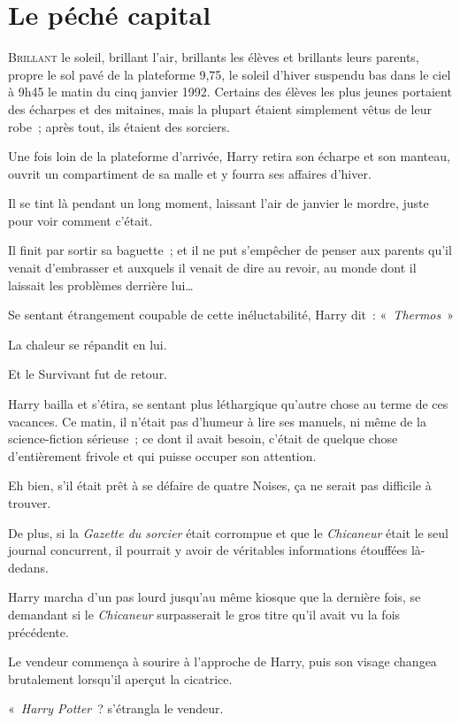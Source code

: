 \chapter{Le péché capital}

\lettrine{B}{rillant} le soleil, brillant l'air, brillants les élèves et brillants leurs parents, propre le sol pavé de la plateforme 9,75, le soleil d'hiver suspendu bas dans le ciel à 9h45 le matin du cinq janvier 1992.
Certains des élèves les plus jeunes portaient des écharpes et des mitaines, mais la plupart étaient simplement vêtus de leur robe~; après tout, ils étaient des sorciers.

Une fois loin de la plateforme d'arrivée, Harry retira son écharpe et son manteau, ouvrit un compartiment de sa malle et y fourra ses affaires d'hiver.

Il se tint là pendant un long moment, laissant l'air de janvier le mordre, juste pour voir comment c'était.

Il finit par sortir sa baguette~; et il ne put s'empêcher de penser aux parents qu'il venait d'embrasser et auxquels il venait de dire au revoir, au monde dont il laissait les problèmes derrière lui…

Se sentant étrangement coupable de cette inéluctabilité, Harry dit~: «~\emph{Thermos}~»

La chaleur se répandit en lui.

Et le Survivant fut de retour.

Harry bailla et s'étira, se sentant plus léthargique qu'autre chose au terme de ces vacances.
Ce matin, il n'était pas d'humeur à lire ses manuels, ni même de la science-fiction sérieuse~; ce dont il avait besoin, c'était de quelque chose d'entièrement frivole et qui puisse occuper son attention.

Eh bien, s'il était prêt à se défaire de quatre Noises, ça ne serait pas difficile à trouver.

De plus, si la \emph{Gazette du sorcier} était corrompue et que le \emph{Chicaneur} était le seul journal concurrent, il pourrait y avoir de véritables informations étouffées là-dedans.

Harry marcha d'un pas lourd jusqu'au même kiosque que la dernière fois, se demandant si le \emph{Chicaneur} surpasserait le gros titre qu'il avait vu la fois précédente.

Le vendeur commença à sourire à l'approche de Harry, puis son visage changea brutalement lorsqu'il aperçut la cicatrice.

«~\emph{Harry Potter}~? s'étrangla le vendeur.

